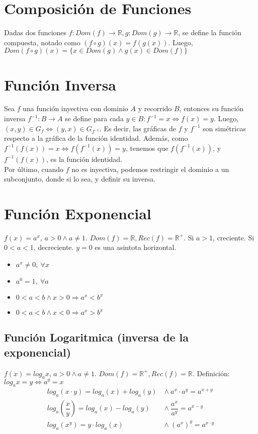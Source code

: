 \documentclass[11pt,a4paper]{article}
\begin{document}
\section{Composici\'on de Funciones}
Dadas dos funciones $f:Dom(f)\rightarrow\mathbb{R},g:Dom(g)\rightarrow\mathbb{R}$, se define la funci\'on compuesta, notado como $(f \circ g)(x) = f(g(x))$. Luego, $Dom(f\circ g)(x) = \{ x \in Dom(g) \land g(x) \in Dom(f) \} $

\section{Funci\'on Inversa}
Sea $f$ una funci\'on inyectiva con dominio $A$ y recorrido $B$, entonces su funci\'on inversa $f^{-1} : B \rightarrow A$ se define para cada $y \in B: f^{-1} = x \iff f(x) = y$. Luego, $(x,y) \in G_f \iff (y,x) \in G_{f^{-1}}$. Es decir, las gr\'aficas de $f$ y $f^{-1}$ son sim\'etricas respecto a la gr\'afica de la funci\'on identidad. Adem\'as, como $f^{-1}(f(x)) = x \iff f(f^{-1}(x)) = y$, tenemos que $f(f^{-1}(x))$, y $f^{-1}(f(x))$, es la funci\'on identidad. \\

Por \'ultimo, cuando $f$ no es inyectiva, podemos restringir el dominio a un subconjunto, donde si lo sea, y definir su inversa.

\section{Funci\'on Exponencial}
$f(x) = a^x$, $a>0 \land a \not = 1$. $Dom(f) = \mathbb{R}, Rec(f) = \mathbb{R}^+$. Si $a>1$, creciente. Si $0<a<1$, decreciente. $y=0$ es una asintota horizontal.
\begin{itemize}
\item $a^x \not = 0,\ \forall x$
\item $a^0 = 1,\ \forall a$
\item $0 < a < b \land x > 0 \Rightarrow a^x < b^x$
\item $0 < a < b \land x < 0 \Rightarrow a^x > b^x$
\end{itemize}
\subsection{Funci\'on Logaritmica (inversa de la exponencial)}
$f(x) = log_ax$, $a>0 \land a \not = 1$. $Dom(f) = \mathbb{R}^+, Rec(f) = \mathbb{R}$. Definici\'on: $log_ax = y \iff a^y = x$
\begin{align*}
log_a(x\cdot y) = log_a(x) + log_a(y)\ &\land\ a^x \cdot a^y = a^{x+y}\\
log_a\left(\dfrac{x}{y}\right) = log_a(x) - log_a(y)\ &\land\ \dfrac{a^x}{a^y} = a^{x-y}\\
log_a(x^y) = y \cdot log_a(x)\ &\land\ (a^x)^y = a^{x\cdot y}\\
\end{align*}
\end{document}
